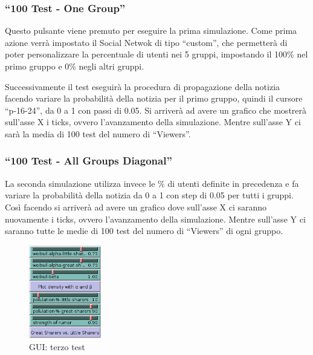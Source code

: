 \subsubsection{``100 Test - One Group''}
Questo pulsante viene premuto per eseguire la prima simulazione. 
Come prima azione verrà impostato il Social Netwok di tipo ``custom'', che permetterà di poter personalizzare
la percentuale di utenti nei 5 gruppi, impostando il 100\% nel primo gruppo e 0\% negli altri gruppi. 

Successivamente il test eseguirà la procedura di propagazione della notizia facendo variare la probabilità 
della notizia per il primo gruppo, quindi il cursore ``p-16-24'', da 0 a 1 con passi di 0.05.
Si arriverà ad avere un grafico che mostrerà sull'asse X i ticks, ovvero l'avanzamento della simulazione. 
Mentre sull'asse Y ci sarà la media di 100 test del numero di ``Viewers''.

\subsubsection{``100 Test - All Groups Diagonal''}
La seconda simulazione utilizza invece le \% di utenti definite in precedenza e fa variare la probabilità 
della notizia da 0 a 1 con step di 0.05 per tutti i gruppi.
Così facendo si arriverà ad avere un grafico dove sull'asse X ci saranno nuovamente i ticks, ovvero l'avanzamento della simulazione.
Mentre sull'asse Y ci saranno tutte le medie di 100 test del numero di ``Viewers'' di ogni gruppo.

\begin{figure}
  \vspace*{-35pt}
  \begin{center}
    \includegraphics[width=0.28\textwidth]{img/gui-third-test.png}
  \end{center}
 \vspace*{-10pt}
 \caption{GUI: terzo test}
 \vspace*{-20pt}
 \label{img:gui_third_test}
\end{figure}



